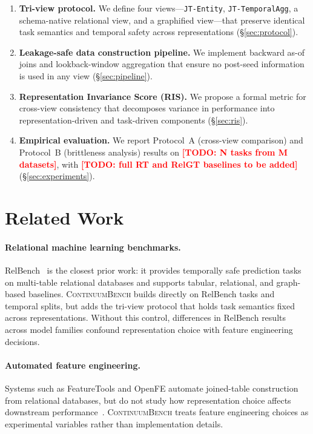 \documentclass[11pt]{article}
\newcommand{\cb}{\textsc{ContinuumBench}}
\newcommand{\todo}[1]{\textcolor{red}{\textbf{[TODO: #1]}}}
\newcommand{\viewname}[1]{\texttt{#1}}
\begin{document}
\begin{enumerate}
  \item \textbf{Tri-view protocol.} We define four views---\viewname{JT-Entity},
    \viewname{JT-TemporalAgg}, a schema-native relational view, and a
    graphified view---that preserve identical task semantics and temporal
    safety across representations (\S\ref{sec:protocol}).

  \item \textbf{Leakage-safe data construction pipeline.}
    We implement backward as-of joins and lookback-window aggregation
    that ensure no post-seed information is used in any view
    (\S\ref{sec:pipeline}).

  \item \textbf{Representation Invariance Score (RIS).}
    We propose a formal metric for cross-view consistency that
    decomposes variance in performance into representation-driven and
    task-driven components (\S\ref{sec:ris}).

  \item \textbf{Empirical evaluation.}
    We report Protocol~A (cross-view comparison) and Protocol~B
    (brittleness analysis) results on \todo{N tasks from M datasets},
    with \todo{full RT and RelGT baselines to be added}
    (\S\ref{sec:experiments}).
\end{enumerate}

\section{Related Work}
\label{sec:related}

\paragraph{Relational machine learning benchmarks.}
RelBench~\citep{relbench} is the closest prior work: it provides
temporally safe prediction tasks on multi-table relational databases
and supports tabular, relational, and graph-based baselines.
\cb{} builds directly on RelBench tasks and temporal splits, but adds
the tri-view protocol that holds task semantics fixed across
representations.
Without this control, differences in RelBench results across model
families confound representation choice with feature engineering
decisions.

\paragraph{Automated feature engineering.}
Systems such as FeatureTools and OpenFE automate joined-table
construction from relational databases, but do not study how
representation choice affects downstream performance~\citep{featuretools}.
\cb{} treats feature engineering choices as experimental variables
rather than implementation details.
\end{document}
